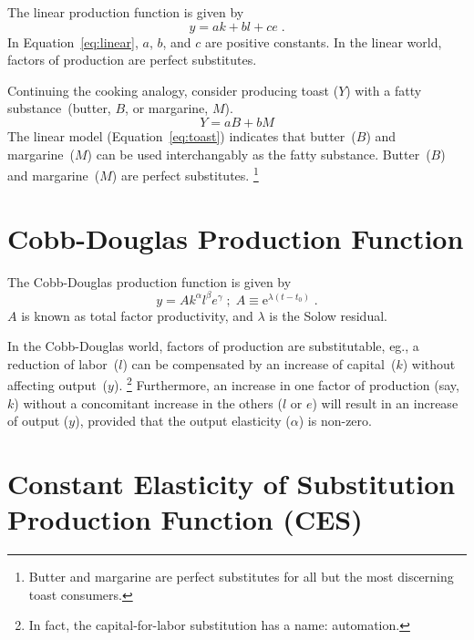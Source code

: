 \documentclass[preprint,authoryear,12pt]{elsarticle}
\begin{document}
The linear production function is given by
%
\begin{equation} \label{eq:linear}
  y = a k + b l + c e \; .
\end{equation}
%
In Equation~\ref{eq:linear}, $a$, $b$, and $c$ are positive constants.
In the linear world, factors of production are perfect substitutes.

Continuing the cooking analogy, consider producing toast ($Y$) 
with a fatty substance~(butter, $B$, or margarine, $M$).
%
\begin{equation} \label{eq:toast}
  Y = a B + b M
\end{equation}
%
The linear model (Equation~\ref{eq:toast}) indicates that butter~($B$) and margarine~($M$) 
can be used interchangably as the fatty substance.
Butter~($B$) and margarine~($M$) are perfect substitutes.%
  \footnote{
  Butter and margarine are perfect substitutes for all but the most discerning toast consumers.
  }%



\section{Cobb-Douglas Production Function} 
\label{sec:CD}

The Cobb-Douglas production function is given by
%
\begin{equation} \label{eq:CD}
  y = A k^\alpha l^\beta e^\gamma \; ; \; A \equiv \mathrm{e}^{\lambda(t-t_0)} \; .
\end{equation}
%
$A$ is known as total factor productivity,
and $\lambda$ is the Solow residual.

In the Cobb-Douglas world, factors of production are substitutable, 
eg., a reduction of labor~($l$) can be compensated by an increase of capital~($k$)
without affecting output~($y$).%
  \footnote{
  In fact, the capital-for-labor substitution has a name: automation.
  }
Furthermore, an increase in one factor of production (say, $k$)
without a concomitant increase in the others ($l$ or $e$) 
will result in an increase of output ($y$), provided that the output elasticity 
($\alpha$) is non-zero.


\section{Constant Elasticity of Substitution Production Function (CES)} 
\label{sec:CES}
\end{document}
